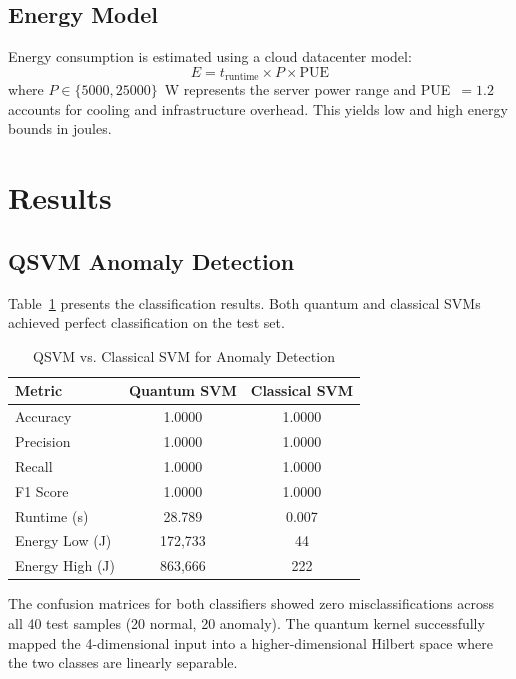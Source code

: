 \documentclass[conference]{IEEEtran}
\begin{document}
\subsection{Energy Model}
Energy consumption is estimated using a cloud datacenter model:
\begin{equation}
E = t_{\text{runtime}} \times P \times \text{PUE}
\end{equation}
where $P \in \{5000, 25000\}$~W represents the server power range and PUE~$= 1.2$ accounts for cooling and infrastructure overhead. This yields low and high energy bounds in joules.

\section{Results}

\subsection{QSVM Anomaly Detection}

Table~\ref{tab:qsvm} presents the classification results. Both quantum and classical SVMs achieved perfect classification on the test set.

\begin{table}[htbp]
\caption{QSVM vs. Classical SVM for Anomaly Detection}
\label{tab:qsvm}
\centering
\begin{tabular}{lcc}
\toprule
\textbf{Metric} & \textbf{Quantum SVM} & \textbf{Classical SVM} \\
\midrule
Accuracy & 1.0000 & 1.0000 \\
Precision & 1.0000 & 1.0000 \\
Recall & 1.0000 & 1.0000 \\
F1 Score & 1.0000 & 1.0000 \\
Runtime (s) & 28.789 & 0.007 \\
Energy Low (J) & 172,733 & 44 \\
Energy High (J) & 863,666 & 222 \\
\bottomrule
\end{tabular}
\end{table}

The confusion matrices for both classifiers showed zero misclassifications across all 40 test samples (20 normal, 20 anomaly). The quantum kernel successfully mapped the 4-dimensional input into a higher-dimensional Hilbert space where the two classes are linearly separable.
\end{document}
